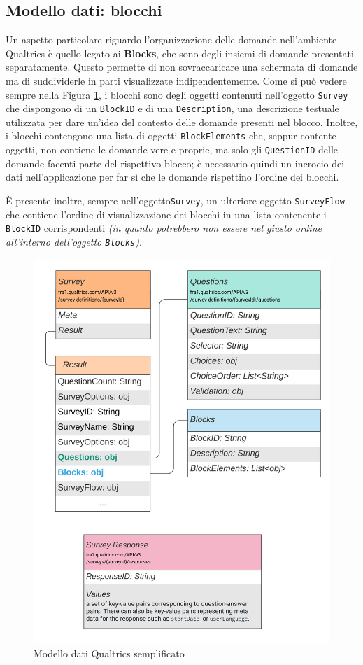 \newpage

\subsection{Modello dati: blocchi}
Un aspetto particolare riguardo l'organizzazione delle domande nell'ambiente Qualtrics è quello legato ai \textbf{Blocks}, che sono degli insiemi di domande presentati separatamente. Questo permette di non sovraccaricare una schermata di domande ma di suddividerle in parti visualizzate indipendentemente.
Come si può vedere sempre nella Figura \ref{fig:modello_semplice_qualtrics}, i blocchi sono degli oggetti contenuti nell'oggetto \texttt{Survey} che dispongono di un \texttt{BlockID} e di una \texttt{Description}, una descrizione testuale utilizzata per dare un'idea del contesto delle domande presenti nel blocco. Inoltre, i blocchi contengono una lista di oggetti \texttt{BlockElements} che, seppur contente oggetti, non contiene le domande vere e proprie, ma solo gli \texttt{QuestionID} delle domande facenti parte del rispettivo blocco; è necessario quindi un incrocio dei dati nell'applicazione per far sì che le domande rispettino l'ordine dei blocchi.

È presente inoltre, sempre nell'oggetto\texttt{Survey}, un ulteriore oggetto \texttt{SurveyFlow} che contiene l'ordine di visualizzazione dei blocchi in una lista contenente i \texttt{BlockID} corrispondenti \textit{(in quanto potrebbero non essere nel giusto ordine all'interno dell'oggetto \texttt{Blocks})}.

\begin{figure}
\centering
\includegraphics[width=\textwidth]{img/modello_semplice_qualtrics}
\caption{Modello dati Qualtrics semplificato}
\label{fig:modello_semplice_qualtrics}
\end{figure}